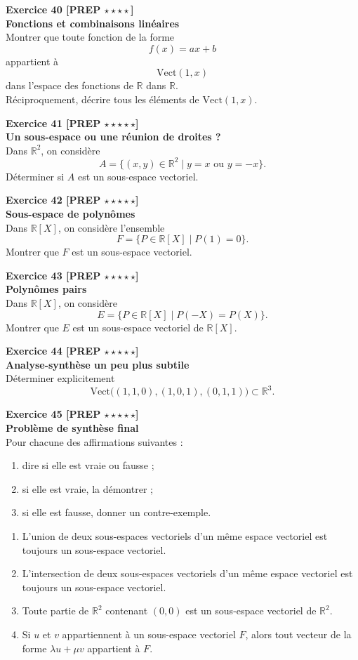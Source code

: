 \documentclass[11pt,a4paper]{article}
\begin{document}
\textbf{Exercice 40 [PREP $\star\star\star\star$]}\\
\textbf{Fonctions et combinaisons linéaires}\\
Montrer que toute fonction de la forme
\[
f(x)=ax+b
\]
appartient à
\[
\mathrm{Vect}(1,x)
\]
dans l’espace des fonctions de $\mathbb{R}$ dans $\mathbb{R}$.\\
Réciproquement, décrire tous les éléments de $\mathrm{Vect}(1,x)$.

\textbf{Exercice 41 [PREP $\star\star\star\star\star$]}\\
\textbf{Un sous-espace ou une réunion de droites ?}\\
Dans $\mathbb{R}^2$, on considère
\[
A=\{(x,y)\in\mathbb{R}^2\mid y=x \text{ ou } y=-x\}.
\]
Déterminer si $A$ est un sous-espace vectoriel.

\textbf{Exercice 42 [PREP $\star\star\star\star\star$]}\\
\textbf{Sous-espace de polynômes}\\
Dans $\mathbb{R}[X]$, on considère l’ensemble
\[
F=\{P\in\mathbb{R}[X]\mid P(1)=0\}.
\]
Montrer que $F$ est un sous-espace vectoriel.

\textbf{Exercice 43 [PREP $\star\star\star\star\star$]}\\
\textbf{Polynômes pairs}\\
Dans $\mathbb{R}[X]$, on considère
\[
E=\{P\in\mathbb{R}[X]\mid P(-X)=P(X)\}.
\]
Montrer que $E$ est un sous-espace vectoriel de $\mathbb{R}[X]$.

\textbf{Exercice 44 [PREP $\star\star\star\star\star$]}\\
\textbf{Analyse-synthèse un peu plus subtile}\\
Déterminer explicitement
\[
\mathrm{Vect}\big((1,1,0),(1,0,1),(0,1,1)\big)\subset\mathbb{R}^3.
\]

\textbf{Exercice 45 [PREP $\star\star\star\star\star$]}\\
\textbf{Problème de synthèse final}\\
Pour chacune des affirmations suivantes :
\begin{enumerate}[label=\alph*)]
    \item dire si elle est vraie ou fausse ;
    \item si elle est vraie, la démontrer ;
    \item si elle est fausse, donner un contre-exemple.
\end{enumerate}

\begin{enumerate}[label=\arabic*)]
    \item L’union de deux sous-espaces vectoriels d’un même espace vectoriel est toujours un sous-espace vectoriel.
    \item L’intersection de deux sous-espaces vectoriels d’un même espace vectoriel est toujours un sous-espace vectoriel.
    \item Toute partie de $\mathbb{R}^2$ contenant $(0,0)$ est un sous-espace vectoriel de $\mathbb{R}^2$.
    \item Si $u$ et $v$ appartiennent à un sous-espace vectoriel $F$, alors tout vecteur de la forme $\lambda u+\mu v$ appartient à $F$.
\end{enumerate}
\end{document}
